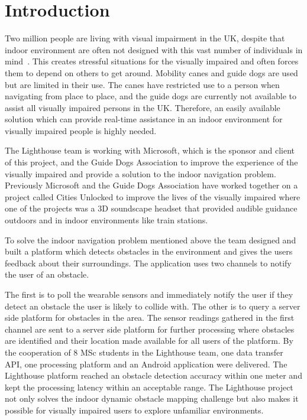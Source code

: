 \documentclass[prodmode,acmtosem]{acmsmall} %
\begin{document}
\maketitle

\section{Introduction}

Two million people are living with visual impairment in the UK, despite that indoor environment are often not designed with this vast number of individuals in mind~\cite{NHSBlindStatistics}. This creates stressful situations for the visually impaired and often forces them to depend on others to get around. Mobility canes and guide dogs are used but are limited in their use. The canes have restricted use to a person when navigating from place to place, and the guide dogs are currently not available to assist all visually impaired persons in the UK. Therefore, an easily available solution which can provide real-time assistance in an indoor environment for visually impaired people is highly needed. 

The Lighthouse team is working with Microsoft, which is the sponsor and client of this project, and the Guide Dogs Association to improve the experience of the visually impaired and provide a solution to the indoor navigation problem. Previously Microsoft and the Guide Dogs Association have worked together on a project called Cities Unlocked to improve the lives of the visually impaired where one of the projects was a 3D soundscape headset that provided audible guidance outdoors and in indoor environments like train stations.

To solve the indoor navigation problem mentioned above the team designed and built a platform which detects obstacles in the environment and gives the users feedback about their surroundings. The application uses two channels to notify the user of an obstacle.

The first is to poll the wearable sensors and immediately notify the user if they detect an obstacle the user is likely to collide with. The other is to query a server side platform for obstacles in the area. The sensor readings gathered in the first channel are sent to a server side platform for further processing where obstacles are identified and their location made available for all users of the platform. 
By the cooperation of 8 MSc students in the Lighthouse team, one data transfer API, one processing platform and an Android application were delivered. 
The Lighthouse platform reached an obstacle detection accuracy within one meter and kept the processing latency within an acceptable range. The Lighthouse project not only solves the indoor dynamic obstacle mapping challenge but also makes it possible for visually impaired users to explore unfamiliar environments.
\end{document}
